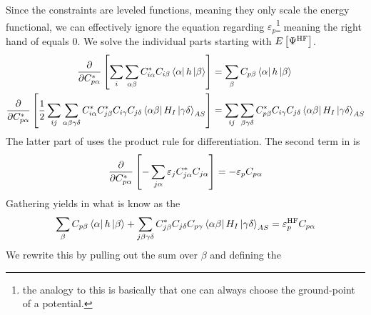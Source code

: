         Since the constraints are leveled functions, meaning they only scale
        the energy functional, we can effectively ignore the equation regarding
        $\varepsilon_p$\footnote{the analogy to this is basically that one can
        always choose the ground-point of a potential.} meaning the right hand
        of  equals $0$. We solve the individual parts
        starting with $E\left[\Psi^{\text{HF}}\right]$.
            \begin{equation}
                \begin{aligned}
                    \frac{\mathrm{\partial}}{\mathrm{\partial} C^{*}_{p\alpha}}
                    \left[\sum_i\sum_{\alpha\beta} C^{*}_{i\alpha}C_{i\beta}
                    \bra{\alpha}h\ket{\beta}\right] &=
                    \sum_{\beta}C_{p\beta}\bra{\alpha}h\ket{\beta} \\
                    \frac{\mathrm{\partial}}{\mathrm{\partial} C^{*}_{p\alpha}}
                    \left[\frac{1}{2}\sum_{ij}\sum_{\alpha\beta\gamma\delta}
                    C^{*}_{i\alpha}C^{*}_{j\beta}C_{i\gamma}C_{j\delta}
                    \bra{\alpha\beta}H_I\ket{\gamma\delta}_{AS}\right] &=
                    \sum_{ij}\sum_{\beta\gamma\delta}
                    C^{*}_{p\beta}C_{i\gamma}C_{j\delta}
                    \bra{\alpha\beta}H_I\ket{\gamma\delta}_{AS}
                \end{aligned}
                \label{eq:HFderEFunc}
            \end{equation}
        The latter part of  uses the product rule for
        differentiation. The second term in  is
            \begin{equation}
                \frac{\mathrm{\partial}}{\mathrm{\partial} C^{*}_{p\alpha}} \left[-\sum_{j\alpha}
                \varepsilon_jC^{*}_{j\alpha}C_{j\alpha}\right] =
                -\varepsilon_pC_{p\alpha}
                \label{eq:HFderSecond}
            \end{equation}
        Gathering  yields in what is know as
        the 
            \begin{equation}
                \sum_{\beta}C_{p\beta}\bra{\alpha}h\ket{\beta} +
                \sum_{j\beta\gamma\delta}C^{*}_{j\beta} C_{j\delta}C_{p\gamma}
                \bra{\alpha\beta}H_I\ket{\gamma\delta}_{AS} =
                \varepsilon^{\text{HF}}_pC_{p\alpha}
                \label{eq:HFEquations}
            \end{equation}
        We rewrite this by pulling out the sum over $\beta$ and defining the
